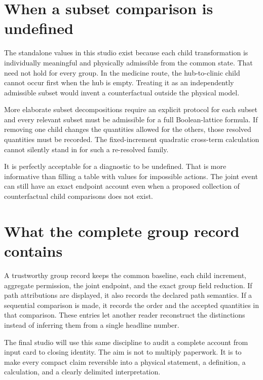 \section{When a subset comparison is undefined}

The standalone values in this studio exist because each child transformation is individually meaningful and physically admissible from the common state. That need not hold for every group. In the medicine route, the hub-to-clinic child cannot occur first when the hub is empty. Treating it as an independently admissible subset would invent a counterfactual outside the physical model.

More elaborate subset decompositions require an explicit protocol for each subset and every relevant subset must be admissible for a full Boolean-lattice formula. If removing one child changes the quantities allowed for the others, those resolved quantities must be recorded. The fixed-increment quadratic cross-term calculation cannot silently stand in for such a re-resolved family.

It is perfectly acceptable for a diagnostic to be undefined. That is more informative than filling a table with values for impossible actions. The joint event can still have an exact endpoint account even when a proposed collection of counterfactual child comparisons does not exist.

\section{What the complete group record contains}

A trustworthy group record keeps the common baseline, each child increment, aggregate permission, the joint endpoint, and the exact group field reduction. If path attributions are displayed, it also records the declared path semantics. If a sequential comparison is made, it records the order and the accepted quantities in that comparison. These entries let another reader reconstruct the distinctions instead of inferring them from a single headline number.

The final studio will use this same discipline to audit a complete account from input card to closing identity. The aim is not to multiply paperwork. It is to make every compact claim reversible into a physical statement, a definition, a calculation, and a clearly delimited interpretation.
